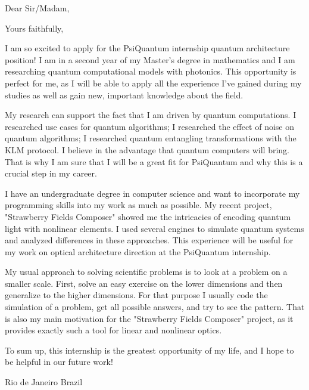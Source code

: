 \documentclass[12pt,a4paper,sans]{moderncv}        %
\begin{document}
	\clearpage
	\date{\today}
	\opening{Dear Sir/Madam,}
	\closing{Yours faithfully,}
	\makelettertitle
	I am so excited to apply for the PsiQuantum internship quantum architecture position! I am in a second year of my Master's degree in mathematics and I am researching quantum computational models with photonics. This opportunity is perfect for me, as I will be able to apply all the experience I've gained during my studies as well as gain new, important knowledge about the field.
	
	My research can support the fact that I am driven by quantum computations. I researched use cases for quantum algorithms; I researched the effect of noise on quantum algorithms; I researched quantum entangling transformations with the KLM protocol. I believe in the advantage that quantum computers will bring. That is why I am sure that I will be a great fit for PsiQuantum and why this is a crucial step in my career.
	
	I have an undergraduate degree in computer science and want to incorporate my programming skills into my work as much as possible. My recent project, "Strawberry Fields Composer" showed me the intricacies of encoding quantum light with nonlinear elements. I used several engines to simulate quantum systems and analyzed differences in these approaches. This experience will be useful for my work on optical architecture direction at the PsiQuantum internship.
	
	My usual approach to solving scientific problems is to look at a problem on a smaller scale. First, solve an easy exercise on the lower dimensions and then generalize to the higher dimensions. For that purpose I usually code the simulation of a problem, get all possible answers, and try to see the pattern. That is also my main motivation for the "Strawberry Fields Composer" project, as it provides exactly such a tool for linear and nonlinear optics.
	
	To sum up, this internship is the greatest opportunity of my life, and I hope to be helpful in our future work!
	

	
	\title{}
	\address{Rua Barata Ribeiro 194}{Rio de Janeiro}{ Brazil }
	\makeletterclosing
	\name{}{}
\end{document}
